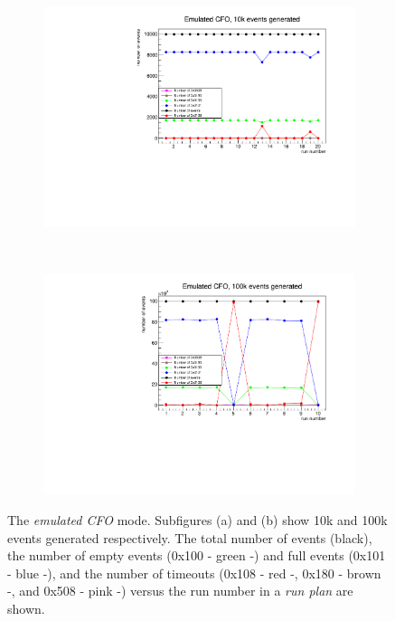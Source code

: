 \begin{figure}[!h]
  \centering
  \begin{subfigure}[t]{0.5\textwidth}
      \centering
      \includegraphics[width=1.1\textwidth]{figures/pdf/10k.pdf}
      \caption{}
  \end{subfigure}%
  ~ 
  \begin{subfigure}[t]{0.5\textwidth}
      \centering
      \includegraphics[width=1.1\textwidth]{figures/pdf/100k.pdf}
      \caption{}
  \end{subfigure}
  \caption[The number of events versus run number (emulated CFO).]{The \textit{emulated CFO} mode. Subfigures (a) and (b) show 10k and 100k events generated respectively. 
  The total number of events (black), the number of empty events (0x100 - green -) and full events (0x101 - blue -), 
  and the number of timeouts (0x108 - red -, 0x180 - brown -, and 0x508 - pink -) versus the run number in a \textit{run plan} are shown.
  }
  \label{fig:corruptionemulated}
\end{figure} 

